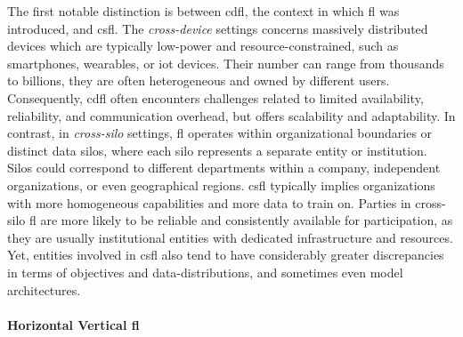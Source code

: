 The first notable distinction is between \gls{cdfl}, the context in which \gls{fl} was introduced, and \gls{csfl}.
The \emph{cross-device} settings concerns massively distributed devices which are typically low-power and resource-constrained, such as smartphones, wearables, or \gls{iot} devices.
Their number can range from thousands to billions, they are often heterogeneous and owned by different users.
Consequently, \gls{cdfl} often encounters challenges related to limited availability, reliability, and communication overhead, but offers scalability and adaptability.
In contrast, in \emph{cross-silo} settings, \gls{fl} operates within organizational boundaries or distinct data silos, where each silo represents a separate entity or institution.
Silos could correspond to different departments within a company, independent organizations, or even geographical regions.
\gls{csfl} typically implies organizations with more homogeneous capabilities and more data to train on.
Parties in cross-silo \gls{fl} are more likely to be reliable and consistently available for participation, as they are usually institutional entities with dedicated infrastructure and resources.
Yet, entities involved in \gls{csfl} also tend to have considerably greater discrepancies in terms of objectives and data-distributions, and sometimes even model architectures.


\paragraph{Horizontal \vs Vertical \gls{fl}}

